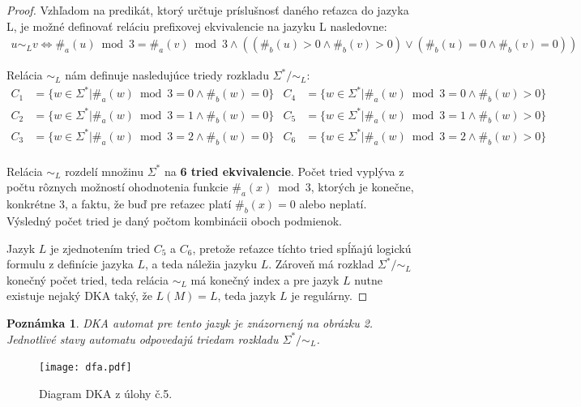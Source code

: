 \documentclass[10pt]{article}
\begin{document}
\begin{proof}
Vzhľadom na predikát, ktorý určtuje príslušnosť daného reťazca do jazyka L, je možné definovať
    reláciu prefixovej ekvivalencie na jazyku L nasledovne:
\begin{align*}
u \sim_L v \iff \#_a(u)\bmod 3 = \#_a(v)\bmod 3 \land ((\#_b(u) > 0 \land \#_b(v) > 0) \lor (\#_b(u) = 0 \land
\#_b(v) = 0))
\end{align*}

Relácia $\sim_L$ nám definuje nasledujúce triedy rozkladu $\Sigma^* / \sim_L$:
\begin{align*}
    C_1 &= \{ w \in \Sigma^* | \#_a(w) \bmod 3 = 0 \land \#_b(w) = 0 \} & C_4 &= \{ w \in \Sigma^* | \#_a(w) \bmod 3 = 0 \land \#_b(w) > 0 \} \\
    C_2 &= \{ w \in \Sigma^* | \#_a(w) \bmod 3 = 1 \land \#_b(w) = 0 \} & C_5 &= \{ w \in \Sigma^* | \#_a(w) \bmod 3 = 1 \land \#_b(w) > 0 \} \\
    C_3 &= \{ w \in \Sigma^* | \#_a(w) \bmod 3 = 2 \land \#_b(w) = 0 \} & C_6 &= \{ w \in \Sigma^* | \#_a(w) \bmod 3 = 2 \land \#_b(w) > 0 \} \\
\end{align*}

Relácia $\sim_L$ rozdelí množinu $\Sigma^*$ na \textbf{6 tried ekvivalencie}. Počet tried vyplýva z
    počtu rôznych možností ohodnotenia funkcie $\#_a(x) \bmod 3$, ktorých je konečne, konkrétne 3, a faktu, že buď pre reťazec
    platí $\#_b(x) = 0$ alebo neplatí. Výsledný počet tried je daný počtom kombinácii oboch
    podmienok.   

Jazyk $L$ je zjednotením tried $C_5$ a $C_6$, pretože reťazce tíchto tried spĺňajú logickú formulu
z definície jazyka $L$, a teda náležia jazyku $L$. Zároveň má rozklad $\Sigma^* / \sim_L$ konečný
počet tried, teda relácia $\sim_L$ má konečný index a pre jazyk $L$ nutne existuje nejaký DKA taký,
že $L(M) = L$, teda jazyk $L$ je regulárny. 
\end{proof}
\newtheorem*{remark}{Poznámka}
\begin{remark}
DKA automat pre tento jazyk je znázornený na obrázku 2. Jednotlivé stavy automatu odpovedajú
    triedam rozkladu $\Sigma^* / \sim_L$.
\end{remark}
\begin{figure}[h!]
    \label{automata}
    \centering
    \texttt{[image: dfa.pdf]}
    \caption{Diagram DKA z úlohy č.5.}
\end{figure}
\end{document}
